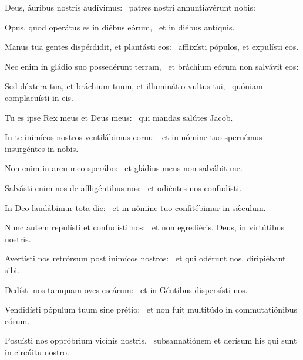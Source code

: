 \item Deus, áuribus nostris audívimus:~\psstar{} patres nostri annuntiavérunt nobis:

\item Opus, quod operátus es in diébus eórum,~\psstar{} et in diébus antíquis.

\item Manus tua gentes dispérdidit, et plantásti eos:~\psstar{} afflixísti pópulos, et expulísti eos.

\item Nec enim in gládio suo possedérunt terram,~\psstar{} et bráchium eórum non salvávit eos:

\item Sed déxtera tua, et bráchium tuum, et illuminátio vultus tui,~\psstar{} quóniam complacuísti in eis.

\item Tu es ipse Rex meus et Deus meus:~\psstar{} qui mandas salútes Jacob.

\item In te inimícos nostros ventilábimus cornu:~\psstar{} et in nómine tuo spernémus insurgéntes in nobis.

\item Non enim in arcu meo sperábo:~\psstar{} et gládius meus non salvábit me.

\item Salvásti enim nos de affligéntibus nos:~\psstar{} et odiéntes nos confudísti.

\item In Deo laudábimur tota die:~\psstar{} et in nómine tuo confitébimur in sǽculum.

\item Nunc autem repulísti et confudísti nos:~\psstar{} et non egrediéris, Deus, in virtútibus nostris.

\item Avertísti nos retrórsum post inimícos nostros:~\psstar{} et qui odérunt nos, diripiébant sibi.

\item Dedísti nos tamquam oves escárum:~\psstar{} et in Géntibus dispersísti nos.

\item Vendidísti pópulum tuum sine prétio:~\psstar{} et non fuit multitúdo in commutatiónibus eórum.

\item Posuísti nos oppróbrium vicínis nostris,~\psstar{} subsannatiónem et derísum his qui sunt in circúitu nostro.

